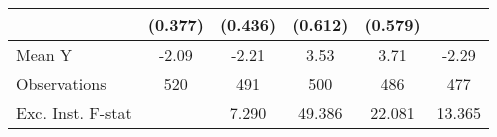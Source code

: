 {\begin{tabular}{l*{5}{c}}
            &     (0.377)         &     (0.436)         &     (0.612)         &     (0.579)         &                     \\
\midrule
Mean Y      &       -2.09         &       -2.21         &        3.53         &        3.71         &       -2.29         \\
Observations&         520         &         491         &         500         &         486         &         477         \\
Exc. Inst. F-stat&                     &       7.290         &      49.386         &      22.081         &      13.365         \\
\bottomrule
\end{tabular}
}
